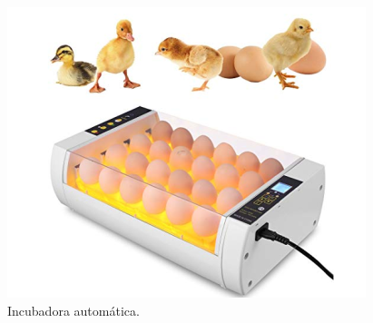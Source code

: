\documentclass[12pt,letterpaper]{article}
\begin{document}




\begin{figure}[H]
\centering
\includegraphics[scale=1]{./images/pollos.png} 
\caption{Incubadora automática.}
\label{f1}
\end{figure}




\renewcommand{\refname}{Bibliografía}
\printbibliography

\end{document}
